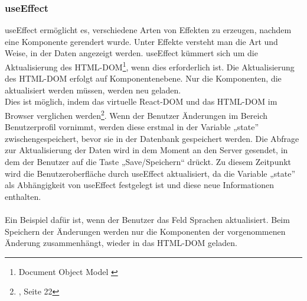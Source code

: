 \subsubsection*{useEffect}
useEffect ermöglicht es, verschiedene Arten von Effekten zu erzeugen, nachdem eine Komponente gerendert wurde. Unter Effekte versteht man die Art und Weise, in der Daten angezeigt werden. useEffect kümmert sich um die Aktualisierung des HTML-DOM\footnote{Document Object Model {\cite{MO2}}}, wenn dies erforderlich ist. Die Aktualisierung des HTML-DOM erfolgt auf Komponentenebene. Nur die Komponenten, die aktualisiert werden müssen, werden neu geladen.\\
Dies ist möglich, indem  das virtuelle React-DOM{\cite{R06}} und das HTML-DOM im Browser verglichen werden\footnote{{\cite{AN1}, Seite 22}}. Wenn der Benutzer Änderungen im Bereich Benutzerprofil vornimmt, werden diese erstmal in der Variable „state” zwischengespeichert, bevor sie in der Datenbank gespeichert werden. Die Abfrage zur Aktualisierung der Daten wird in dem Moment an den Server gesendet, in dem der Benutzer auf die Taste „Save/Speichern“ drückt. Zu diesem Zeitpunkt wird die Benutzeroberfläche durch useEffect aktualisiert, da die Variable „state” als Abhängigkeit von useEffect festgelegt ist und diese neue Informationen enthalten.
\\\\
Ein Beispiel dafür ist, wenn der Benutzer das Feld Sprachen aktualisiert. Beim Speichern der Änderungen werden nur die Komponenten der vorgenommenen Änderung zusammenhängt, wieder in das HTML-DOM geladen.

